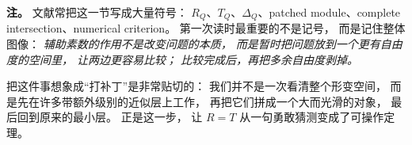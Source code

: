 \textbf{注。}
文献常把这一节写成大量符号：
$R_Q$、$T_Q$、$\Delta_Q$、patched module、complete intersection、numerical criterion。
第一次读时最重要的不是记号，
而是记住整体图像：
\emph{辅助素数的作用不是改变问题的本质，
而是暂时把问题放到一个更有自由度的空间里，
让两边更容易比较；
比较完成后，再把多余自由度剥掉。}

把这件事想象成“打补丁”是非常贴切的：
我们并不是一次看清整个形变空间，
而是先在许多带额外级别的近似层上工作，
再把它们拼成一个大而光滑的对象，
最后回到原来的最小层。
正是这一步，
让 $R=T$ 从一句勇敢猜测变成了可操作定理。
